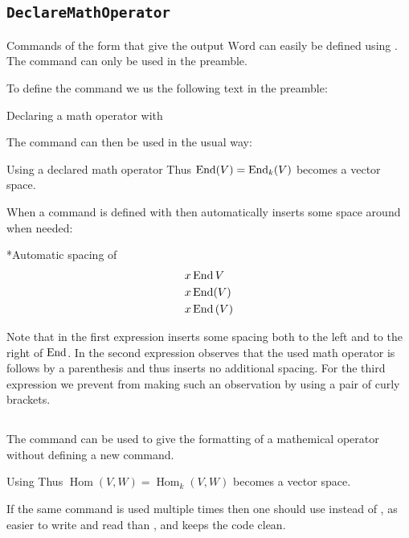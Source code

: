 \subsection{\texttt{DeclareMathOperator}}

Commands of the form  that give the output $\mathrm{Word}$ can easily be defined using .
The command  can only be used in the preamble.

To define the command  we us the following text in the preamble:
\begin{showcode}{Declaring a math operator with~}
\DeclareMathOperator{\End}{End}
\end{showcode}
The command  can then be used in the usual way:
\begin{showlatex}{Using a declared math operator}
Thus $\End(V) = \End_k(V)$ becomes a vector space.
\end{showlatex}
When a command  is defined with  then  automatically inserts some space around  when needed:
\begin{showlatex}*{Automatic spacing of~}
\begin{align*}
&x \End V
\\
&x \End(V)
\\
&x \End {(V)}
\end{align*}
\end{showlatex}
Note that in the first expression  inserts some spacing both to the left and to the right of $\End$.
In the second expression  observes that the used math operator is follows by a parenthesis and thus inserts no additional spacing.
For the third expression we prevent  from making such an observation by using a pair of curly brackets.



\subsection{}

The command  can be used to give the formatting of a mathemical operator without defining a new command.
\begin{showlatex}{Using }
Thus $\operatorname{Hom}(V,W) = \operatorname{Hom}_k(V,W)$ becomes a vector space.
\end{showlatex}
If the same command is used multiple times then one should use  instead of , as  easier to write and read than , and keeps the code clean.

